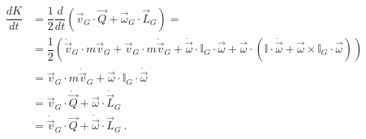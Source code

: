 \documentclass[letterpaper,10pt,english]{jupyterBook}
\begin{document}
\begin{equation*}
\begin{split}\begin{aligned}
  \dfrac{d K}{dt}
  & = \dfrac{1}{2} \dfrac{d}{dt} \left( \vec{v}_G \cdot \vec{Q} + \vec{\omega}_G \cdot \vec{L}_G \right) = \\
  & = \dfrac{1}{2} \left( \dot{\vec{v}}_G \cdot m \vec{v}_G + \vec{v}_G \cdot m \dot{\vec{v}}_G + \dot{\vec{\omega}} \cdot \mathbb{I}_G \cdot \vec{\omega} + \vec{\omega} \cdot \left(  \mathbb{I} \cdot \dot{\vec{\omega}} + \vec{\omega} \times \mathbb{I}_G \cdot \vec{\omega} \right) \right) \\
  & = \vec{v}_G \cdot m \dot{\vec{v}}_G + \vec{\omega} \cdot \mathbb{I}_G \cdot \dot{\vec{\omega}} \\
  & = \vec{v}_G \cdot \dot{\vec{Q}} + \vec{\omega} \cdot \dot{\vec{L}}_G \\
  & = \dot{\vec{v}}_G \cdot \vec{Q} + \dot{\vec{\omega}} \cdot \vec{L}_G \ .
\end{aligned}\end{split}
\end{equation*}
\end{document}
